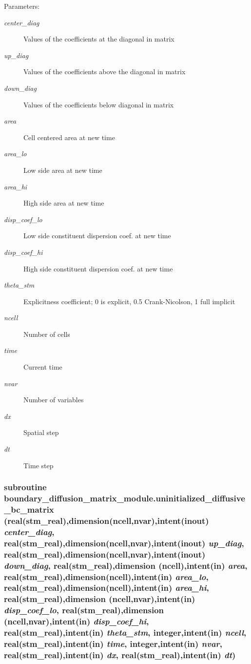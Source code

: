 \begin{Desc}
\item[Parameters:]
\begin{description}
\item[{\em center\_\-diag}]Values of the coefficients at the diagonal in matrix\item[{\em up\_\-diag}]Values of the coefficients above the diagonal in matrix\item[{\em down\_\-diag}]Values of the coefficients below diagonal in matrix\item[{\em area}]Cell centered area at new time \item[{\em area\_\-lo}]Low side area at new time\item[{\em area\_\-hi}]High side area at new time \item[{\em disp\_\-coef\_\-lo}]Low side constituent dispersion coef. at new time\item[{\em disp\_\-coef\_\-hi}]High side constituent dispersion coef. at new time\item[{\em theta\_\-stm}]Explicitness coefficient; 0 is explicit, 0.5 Crank-Nicolson, 1 full implicit \item[{\em ncell}]Number of cells\item[{\em time}]Current time\item[{\em nvar}]Number of variables\item[{\em dx}]Spatial step \item[{\em dt}]Time step \end{description}
\end{Desc}
\hypertarget{a00055_1519a5a563e79c544b761ce6f9e5e55f}{
\subsubsection[{uninitialized\_\-diffusive\_\-bc\_\-matrix}]{\setlength{\rightskip}{0pt plus 5cm}subroutine boundary\_\-diffusion\_\-matrix\_\-module.uninitialized\_\-diffusive\_\-bc\_\-matrix (real(stm\_\-real),dimension(ncell,nvar),intent(inout) {\em center\_\-diag}, \/  real(stm\_\-real),dimension(ncell,nvar),intent(inout) {\em up\_\-diag}, \/  real(stm\_\-real),dimension(ncell,nvar),intent(inout) {\em down\_\-diag}, \/  real(stm\_\-real),dimension (ncell),intent(in) {\em area}, \/  real(stm\_\-real),dimension(ncell),intent(in) {\em area\_\-lo}, \/  real(stm\_\-real),dimension(ncell),intent(in) {\em area\_\-hi}, \/  real(stm\_\-real),dimension (ncell,nvar),intent(in) {\em disp\_\-coef\_\-lo}, \/  real(stm\_\-real),dimension (ncell,nvar),intent(in) {\em disp\_\-coef\_\-hi}, \/  real(stm\_\-real),intent(in) {\em theta\_\-stm}, \/  integer,intent(in) {\em ncell}, \/  real(stm\_\-real),intent(in) {\em time}, \/  integer,intent(in) {\em nvar}, \/  real(stm\_\-real),intent(in) {\em dx}, \/  real(stm\_\-real),intent(in) {\em dt})}}
\label{a00055_1519a5a563e79c544b761ce6f9e5e55f}


